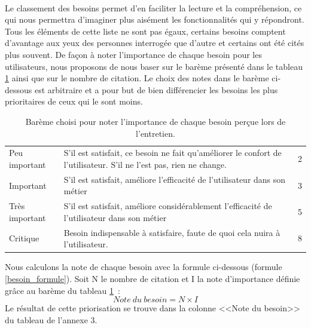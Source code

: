 			\paragraph{}%
			Le classement des besoins permet d'en faciliter la lecture et la
			compréhension, ce qui nous permettra d'imaginer plus aisément les
			fonctionnalités qui y répondront. Tous les éléments de cette
			liste ne sont pas égaux, certains besoins comptent d'avantage aux yeux des
			personnes interrogée que d'autre et certains ont été cités plus
			souvent.\newline
			De façon à noter l'importance de chaque besoin pour les utilisateurs, nous
			proposons de nous baser sur le barème présenté dans le tableau
			\ref{bareme_besoins} ainsi que sur le nombre de citation. Le choix des notes
			dans le barème ci-dessous est arbitraire et a pour but
			de bien différencier les besoins les plus prioritaires de ceux qui le sont moins.
			\begin{table}[H]
				\centering
				\caption{\label{bareme_besoins} Barème choisi pour noter l'importance de
				chaque besoin perçue lors de l'entretien.}
				\begin{tabular}{| p{4cm} | p{8cm} | p{2cm} |}
					\hline
						\thead{Priorité}
						&\thead{Description}
						&\thead{Note}
						\\
					\hline
						Peu important
						&
						S'il est satisfait, ce besoin ne fait qu'améliorer le confort de l'utilisateur. S'il ne l'est pas, rien ne change.
						&
						2
						\\
					\hline
						Important
						&
						S'il est satisfait, améliore l'efficacité de l'utilisateur dans son métier
						&
						3
						\\
					\hline
						Très important
						&
						S'il est satisfait, améliore considérablement l'efficacité de l'utilisateur dans son métier
						&
						5
						\\
					\hline
						Critique
						&
						Besoin indispensable à satisfaire, faute de quoi cela nuira à l'utilisateur.
						&
						8
						\\
					\hline
				\end{tabular}
			\end{table}
			Nous calculons la note de chaque besoin avec la formule ci-dessous
			(formule \ref{besoin_formule}).
			Soit N le nombre de citation et I la note d'importance définie grâce au
			barème du tableau \ref{bareme_besoins}~:
			\begin{equation}
				\label{besoin_formule}
				Note\ du\ besoin=N\times I
			\end{equation}
			Le résultat de cette priorisation se trouve dans la colonne <<Note du besoin>>
			du tableau de l'annexe 3.
	
